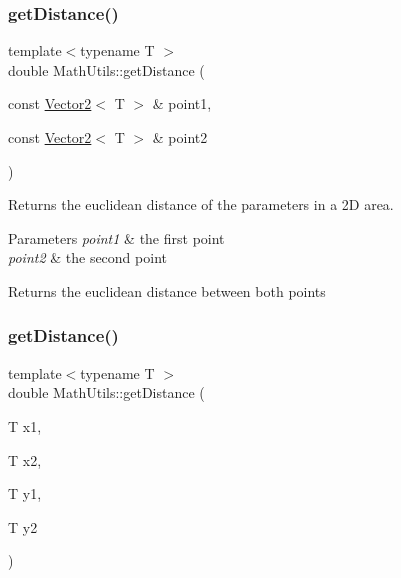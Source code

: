 \subsubsection{\texorpdfstring{getDistance()}{getDistance()}\hspace{0.1cm}{\footnotesize\ttfamily [1/2]}}
{\footnotesize\ttfamily template$<$typename T $>$ \\
double Math\+Utils\+::get\+Distance (\begin{DoxyParamCaption}\item[{const \mbox{\hyperlink{class_vector2}{Vector2}}$<$ T $>$ \&}]{point1,  }\item[{const \mbox{\hyperlink{class_vector2}{Vector2}}$<$ T $>$ \&}]{point2 }\end{DoxyParamCaption})\hspace{0.3cm}{\ttfamily [static]}}



Returns the euclidean distance of the parameters in a 2D area. 


\begin{DoxyParams}{Parameters}
{\em point1} & the first point \\
\hline
{\em point2} & the second point \\
\hline
\end{DoxyParams}
\begin{DoxyReturn}{Returns}
the euclidean distance between both points 
\end{DoxyReturn}
\mbox{\label{class_math_utils_a97856a63da5b123560084391a4ad4b9f}} 
\subsubsection{\texorpdfstring{getDistance()}{getDistance()}\hspace{0.1cm}{\footnotesize\ttfamily [2/2]}}
{\footnotesize\ttfamily template$<$typename T $>$ \\
double Math\+Utils\+::get\+Distance (\begin{DoxyParamCaption}\item[{T}]{x1,  }\item[{T}]{x2,  }\item[{T}]{y1,  }\item[{T}]{y2 }\end{DoxyParamCaption})\hspace{0.3cm}{\ttfamily [static]}}



